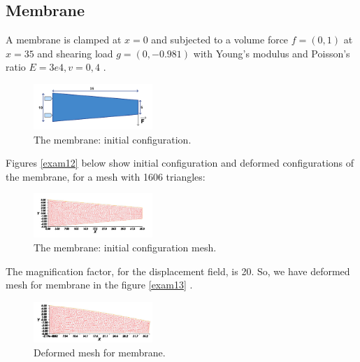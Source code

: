 \documentclass[notitlepage,a4paper,fleqn,9pt]{icmfarticle}
\begin{document}
\begin{multicols}{2}
\subsection{Membrane}
A membrane is clamped at $x=0$ and subjected to a volume force $f=(0,1)$ at $x=35$ and shearing load $g=(0,-0.981)$ with Young's modulus and Poisson's ratio $E=3e4, v=0,4$ \cite{Koko-2007}.
\begin{figure}[H]
  \begin{center}
    \includegraphics[width=0.4\textwidth]{4-1.pdf}
  \end{center}
  \caption{The membrane: initial configuration.}
  \label{exam11}
\end{figure}
Figures \eqref{exam12} below show initial configuration and deformed configurations of the membrane, for a mesh with 1606 triangles:
\begin{figure}[H]
  \begin{center}
    \includegraphics[width=0.4\textwidth]{4-1-1.pdf}
  \end{center}
  \caption{The membrane: initial configuration mesh.}
  \label{exam12}
\end{figure}
The magnification factor, for the displacement field, is 20. So, we have deformed mesh for membrane in the figure \eqref{exam13} .
\begin{figure}[H]
  \begin{center}
    \includegraphics[width=0.4\textwidth]{4-1-2.pdf}
  \end{center}
  \caption{Deformed mesh for membrane.}
  \label{exam13}
\end{figure}




\end{multicols}
\end{document}
